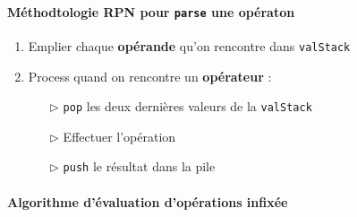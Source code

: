 \documentclass{report}
\begin{document}
\begin{multicols*}{3}
    \paragraph{Méthodtologie RPN pour \texttt{parse} une opératon}

    \begin{enumerate}
      \item Emplier chaque \textbf{opérande} qu'on rencontre dans \texttt{valStack}  
      \item Process quand on rencontre un \textbf{opérateur} : 
        \begin{itemize}
          \item [$\rhd$ ] 
            \texttt{pop} les deux dernières valeurs de la \texttt{valStack}    
          \item [$\rhd$ ] Effectuer l'opération
          \item [$\rhd$ ] \texttt{push} le résultat dans la pile  
        \end{itemize}
    \end{enumerate}

    \end{multicols*}

    \paragraph{Algorithme d'évaluation d'opérations infixée}
\end{document}
